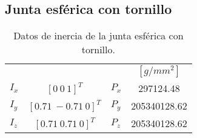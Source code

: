 \subsection{Junta esférica con tornillo}
\begin{table}[hb!]
 \begin{center}
\begin{tabular}{lclc}

% 

 & & & $[g/mm^2]$\\
 $ I_x $ & $ [0 \ 0 \ 1]^T $ & $ P_x $ & 297124.48\\
 $ I_y $ & $ [0.71 \ -0.71 \ 0]^T $ & $ P_y $ & 205340128.62\\
 $ I_z $ & $ [0.71 \ 0.71 \ 0]^T $ & $ P_z $ & 205340128.62
\end{tabular}
\end{center}
\caption{Datos de inercia de la junta esférica con tornillo.}
\label{tab: inertia table joint}
\end{table}
